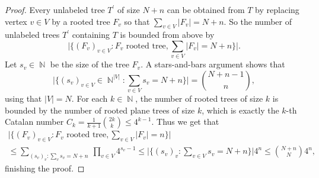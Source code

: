 \documentclass[11pt]{article}
\numberwithin{equation}{section}
\DeclareMathOperator{\N}{\mathbb{N}} %
\theoremstyle{definition}
\begin{document}


\begin{proof}
    Every unlabeled tree $T^\prime$ of size $N+n$ can be obtained from $T$ by replacing vertex $v\in V$ by a rooted tree $F_v$ so that $\sum_{v\in V} |F_v|=N+n$. So the number of unlabeled trees $T^\prime$ containing $T$ is bounded from above by
    \begin{equation*}
        \big| \big\{ (F_v)_{v\in V} : F_v \text{ rooted tree}, \sum_{v \in V} |F_v|=N+n \big\} \big|.
    \end{equation*}
    Let $s_v \in \N$ be the size of the tree $F_v$. A stars-and-bars argument shows that 
    \begin{equation*}
        \big|\big\{ (s_v)_{v \in V} \in \N^{|V|} : \sum_{v \in V} s_v = N+n \big\}\big| = \binom{N+n-1}{n},
    \end{equation*} using that $|V| = N$. For each $k \in \N$, the number of rooted trees of size $k$ is bounded by the number of rooted plane trees of size $k$, which is exactly the $k$-th Catalan number $C_k = \frac{1}{k+1} \binom{2k}{k} \leq 4^{k-1}$. Thus we get that
    \begin{multline*}
        \big| \big\{ (F_v)_{v\in V} : F_v \text{ rooted tree}, \sum_{v \in V} |F_v|=n \big\} \big|
        \\
        \leq
        \sum_{(s_v)_v : \sum_v s_v = N + n} \ \prod_{v \in V} 4^{s_v-1}
        \leq
        \big|\big\{(s_v)_v : \sum_{v\in V} s_v = N + n\big\} \big|  4^{n} \leq \binom{N+n}{N} 4^n ,
    \end{multline*}
    finishing the proof.
\end{proof}
\end{document}

